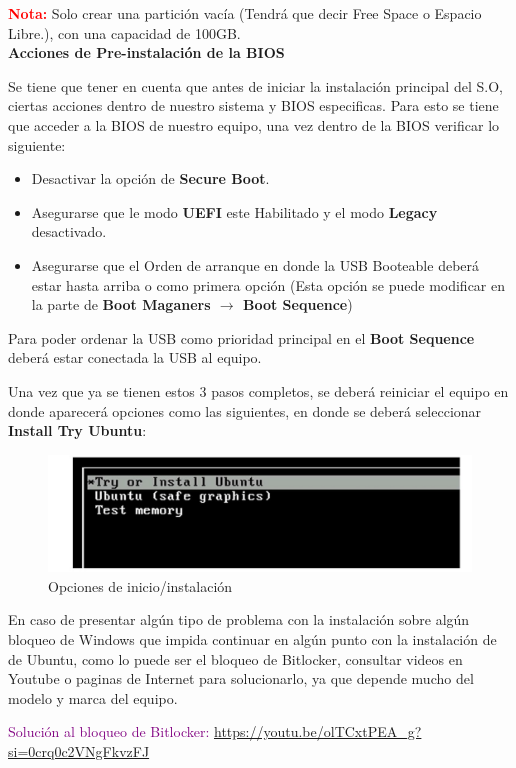 \documentclass[letter,11pt]{article} %
\begin{document}
\begin{enumerate}
		\textbf{\textcolor{red}{Nota:}} Solo crear una partición vacía (Tendrá que decir Free Space o Espacio Libre.), con una capacidad de 100GB.\\
		
		
		\textbf{Acciones de Pre-instalación de la BIOS}
		
		Se tiene que tener en cuenta que antes de iniciar la instalación principal del S.O, ciertas acciones dentro de nuestro sistema y BIOS especificas. Para esto se tiene que acceder a la BIOS de nuestro equipo, una vez dentro de la BIOS verificar lo siguiente:
		
		\begin{itemize}
			\item Desactivar la opción de \textbf{Secure Boot}.
			\item Asegurarse que le modo \textbf{UEFI} este Habilitado y el modo \textbf{Legacy} desactivado.
			\item Asegurarse que el Orden de arranque en donde la USB Booteable deberá estar hasta arriba o como primera opción (Esta opción se puede modificar en la parte de \textbf{Boot Maganers $\longrightarrow$ Boot Sequence})
		\end{itemize}
		
		Para poder ordenar la USB como prioridad principal en el \textbf{Boot Sequence} deberá estar conectada la USB al equipo.
		
		
		Una vez que ya se tienen estos 3 pasos completos, se deberá reiniciar el equipo en donde aparecerá opciones como las siguientes, en donde se deberá seleccionar \textbf{Install Try Ubuntu}:
		
		\begin{figure}[H]
			\centering
			\includegraphics[width=0.5\linewidth]{Imagenes/install}
			\caption{Opciones de inicio/instalación}
			\label{fig:install}
		\end{figure}
		
		En caso de presentar algún tipo de problema con la instalación sobre algún bloqueo de Windows que impida continuar en algún punto con la instalación de de Ubuntu, como lo puede ser el bloqueo de Bitlocker, consultar videos en Youtube o paginas de Internet para solucionarlo, ya que depende mucho del modelo y marca del equipo.
		
		\textcolor{purple}{Solución al bloqueo de Bitlocker:} \url{https://youtu.be/olTCxtPEA_g?si=0crq0c2VNgFkvzFJ}
		

\end{enumerate}
\end{document}

